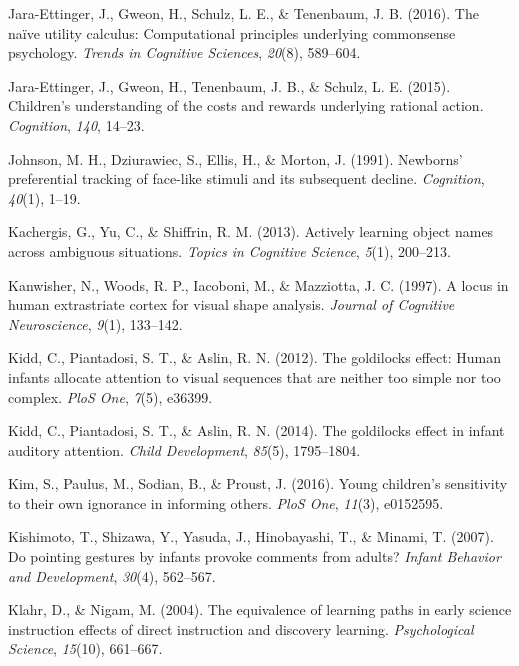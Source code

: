 \documentclass[oneside]{report}
\begin{document}
\leavevmode\hypertarget{ref-jara2016naive}{}%
Jara-Ettinger, J., Gweon, H., Schulz, L. E., \& Tenenbaum, J. B. (2016).
The naïve utility calculus: Computational principles underlying
commonsense psychology. \emph{Trends in Cognitive Sciences},
\emph{20}(8), 589--604.

\leavevmode\hypertarget{ref-jara2015children}{}%
Jara-Ettinger, J., Gweon, H., Tenenbaum, J. B., \& Schulz, L. E. (2015).
Children's understanding of the costs and rewards underlying rational
action. \emph{Cognition}, \emph{140}, 14--23.

\leavevmode\hypertarget{ref-johnson1991newborns}{}%
Johnson, M. H., Dziurawiec, S., Ellis, H., \& Morton, J. (1991).
Newborns' preferential tracking of face-like stimuli and its subsequent
decline. \emph{Cognition}, \emph{40}(1), 1--19.

\leavevmode\hypertarget{ref-kachergis2013actively}{}%
Kachergis, G., Yu, C., \& Shiffrin, R. M. (2013). Actively learning
object names across ambiguous situations. \emph{Topics in Cognitive
Science}, \emph{5}(1), 200--213.

\leavevmode\hypertarget{ref-kanwisher1997locus}{}%
Kanwisher, N., Woods, R. P., Iacoboni, M., \& Mazziotta, J. C. (1997). A
locus in human extrastriate cortex for visual shape analysis.
\emph{Journal of Cognitive Neuroscience}, \emph{9}(1), 133--142.

\leavevmode\hypertarget{ref-kidd2012goldilocks}{}%
Kidd, C., Piantadosi, S. T., \& Aslin, R. N. (2012). The goldilocks
effect: Human infants allocate attention to visual sequences that are
neither too simple nor too complex. \emph{PloS One}, \emph{7}(5),
e36399.

\leavevmode\hypertarget{ref-kidd2014goldilocks}{}%
Kidd, C., Piantadosi, S. T., \& Aslin, R. N. (2014). The goldilocks
effect in infant auditory attention. \emph{Child Development},
\emph{85}(5), 1795--1804.

\leavevmode\hypertarget{ref-kim2016young}{}%
Kim, S., Paulus, M., Sodian, B., \& Proust, J. (2016). Young children's
sensitivity to their own ignorance in informing others. \emph{PloS One},
\emph{11}(3), e0152595.

\leavevmode\hypertarget{ref-kishimoto2007pointing}{}%
Kishimoto, T., Shizawa, Y., Yasuda, J., Hinobayashi, T., \& Minami, T.
(2007). Do pointing gestures by infants provoke comments from adults?
\emph{Infant Behavior and Development}, \emph{30}(4), 562--567.

\leavevmode\hypertarget{ref-klahr2004equivalence}{}%
Klahr, D., \& Nigam, M. (2004). The equivalence of learning paths in
early science instruction effects of direct instruction and discovery
learning. \emph{Psychological Science}, \emph{15}(10), 661--667.
\end{document}
